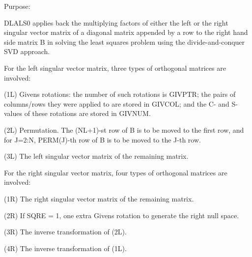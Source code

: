  \begin{DoxyParagraph}{Purpose\+: }
\begin{DoxyVerb} DLALS0 applies back the multiplying factors of either the left or the
 right singular vector matrix of a diagonal matrix appended by a row
 to the right hand side matrix B in solving the least squares problem
 using the divide-and-conquer SVD approach.

 For the left singular vector matrix, three types of orthogonal
 matrices are involved:

 (1L) Givens rotations: the number of such rotations is GIVPTR; the
      pairs of columns/rows they were applied to are stored in GIVCOL;
      and the C- and S-values of these rotations are stored in GIVNUM.

 (2L) Permutation. The (NL+1)-st row of B is to be moved to the first
      row, and for J=2:N, PERM(J)-th row of B is to be moved to the
      J-th row.

 (3L) The left singular vector matrix of the remaining matrix.

 For the right singular vector matrix, four types of orthogonal
 matrices are involved:

 (1R) The right singular vector matrix of the remaining matrix.

 (2R) If SQRE = 1, one extra Givens rotation to generate the right
      null space.

 (3R) The inverse transformation of (2L).

 (4R) The inverse transformation of (1L).\end{DoxyVerb}
 
\end{DoxyParagraph}

